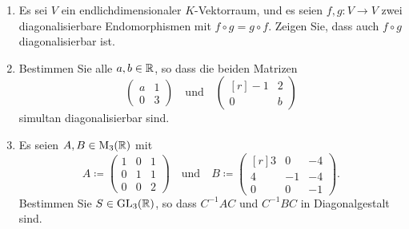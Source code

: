 \documentclass[a4paper, 10pt]{scrartcl}
\begin{document}
\begin{question}[subtitle = Simultane Diagonalisierbarkeit]
  \begin{enumerate}
    \item
      Es sei $V$ ein endlichdimensionaler $K$-Vektorraum, und es seien $f, g \colon V \to V$ zwei diagonalisierbare Endomorphismen mit $f \circ g = g \circ f$.
      Zeigen Sie, dass auch $f \circ g$ diagonalisierbar ist.
    \item
      Bestimmen Sie alle $a, b \in \mathbb{R}$, so dass die beiden Matrizen
      \[
        \begin{pmatrix}
          a & 1 \\
          0 & 3
        \end{pmatrix}
        \quad\text{und}\quad
        \begin{pmatrix*}[r]
          -1  & 2 \\
          0  & b
        \end{pmatrix*}
      \]
      simultan diagonalisierbar sind.
      
    \item
      Es seien $A, B \in \operatorname{M}_{3}(\mathbb{R})$ mit
      \[
                  A
        \coloneqq \begin{pmatrix}
                    1  & 0  & 1 \\
                    0  & 1  & 1 \\
                    0  & 0  & 2
                  \end{pmatrix}
        \quad \text{und} \quad
                  B
        \coloneqq \begin{pmatrix*}[r]
                    3 &  0  & -4  \\
                    4 & -1  & -4  \\
                    0 &  0  & -1
                  \end{pmatrix*}.
      \]
      Bestimmen Sie $S \in \operatorname{GL}_{3}(\mathbb{R})$, so dass $C^{-1} A C$ und $C^{-1} B C$ in Diagonalgestalt sind.
  \end{enumerate}
\end{question}
\end{document}
